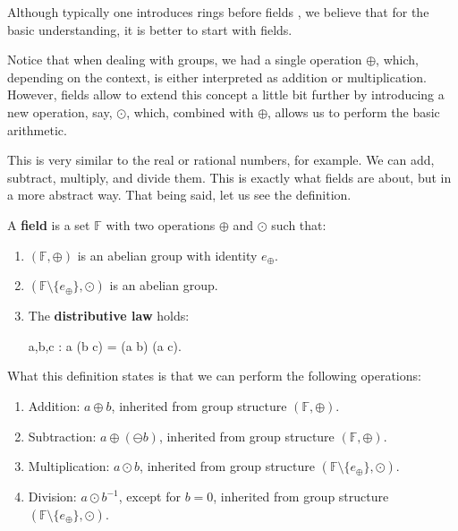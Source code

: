\documentclass[../lecture-notes-148x210.tex]{subfiles}
\begin{document}
Although typically one introduces rings before fields \cite[section 16]{Judson_2012}, we believe that for the 
basic understanding, it is better to start with fields. 

Notice that when dealing with groups, we had a single operation $\oplus$, which, depending on the context, is either 
interpreted as addition or multiplication. However, fields allow to extend this concept a little bit further by 
introducing a new operation, say, $\odot$, which, combined with $\oplus$, allows us to perform the basic arithmetic.

This is very similar to the real or rational numbers, for example. We can add, subtract, multiply, and divide them. 
This is exactly what fields are about, but in a more abstract way. That being said, let us see the definition.

\begin{definition}
    A \textbf{field} is a set $\mathbb{F}$ with two operations $\oplus$ and $\odot$ such that:
    \begin{enumerate}
        \item $(\mathbb{F}, \oplus)$ is an abelian group with identity $e_{\oplus}$.
        \item $(\mathbb{F} \setminus \{e_{\oplus}\}, \odot)$ is an abelian group.
        \item The \textbf{distributive law} holds: 
        \begin{xequation}
            \forall a,b,c \in {}: a \odot (b \oplus c) = (a \odot b) \oplus (a \odot c).            
        \end{xequation}
    \end{enumerate}
\end{definition}

What this definition states is that we can perform the following operations:
\begin{enumerate}
    \item Addition: $a \oplus b$, inherited from group structure $(\mathbb{F}, \oplus)$.
    \item Subtraction: $a \oplus (\ominus b)$, inherited from group structure $(\mathbb{F}, \oplus)$.
    \item Multiplication: $a \odot b$, inherited from group structure $(\mathbb{F} \setminus \{e_{\oplus}\}, \odot)$.
    \item Division: $a \odot b^{-1}$, except for $b=0$, inherited from group structure $(\mathbb{F} \setminus \{e_{\oplus}\}, \odot)$.
\end{enumerate}
\end{document}
